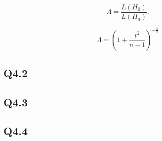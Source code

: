 \[ \Lambda = \frac{L(H_0)}{L(H_a)}. \]

\[ \Lambda = \left( 1+\frac{t^2}{n-1}\right)^{-\frac{n}{2}} \]




\subsection{Q4.2}

\subsection{Q4.3}

\subsection{Q4.4}
